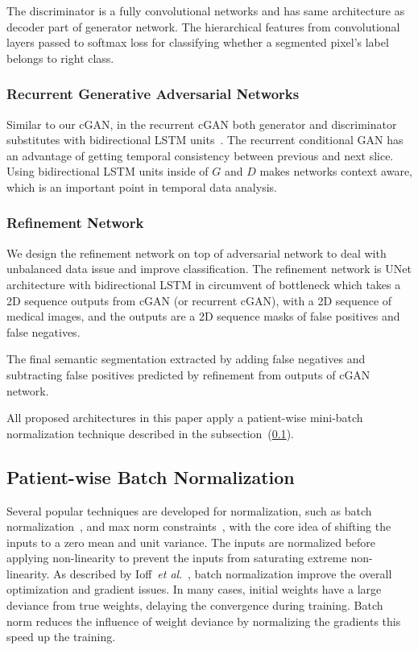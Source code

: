 \documentclass[10pt,twocolumn,letterpaper]{article}
\begin{document}
The discriminator is a fully convolutional networks and has same architecture as decoder part of generator network. The hierarchical features from convolutional layers passed to softmax loss for classifying whether a segmented pixel's label belongs to right class.

\subsubsection{Recurrent Generative Adversarial Networks}\label{method_sec1b}
Similar to our cGAN, in the recurrent cGAN both generator and discriminator substitutes with bidirectional LSTM units~\cite{graves2005framewise}.
The recurrent conditional GAN has an advantage of getting temporal consistency between previous and next slice.
Using bidirectional LSTM units inside of $G$ and $D$ makes networks context aware, which is an important point in temporal data analysis.

\subsubsection{Refinement Network}\label{refarch}

We design the refinement network on top of adversarial network to deal with unbalanced data issue and improve classification. The refinement network is UNet architecture with bidirectional LSTM in circumvent of bottleneck which takes a 2D sequence outputs from cGAN (or recurrent cGAN), with a 2D sequence of medical images, and the outputs are a 2D sequence masks of false positives and false negatives.

The final semantic segmentation extracted by adding false negatives and subtracting false positives predicted by refinement from outputs of cGAN network.

All proposed architectures in this paper apply a patient-wise mini-batch normalization technique described in the subsection~(\ref{batch_norm}).

\subsection{Patient-wise Batch Normalization}\label{batch_norm}
Several popular techniques are developed for normalization, such as batch normalization~\cite{IoffeS15}, and max norm constraints~\cite{srebro2005rank}, with the core idea of shifting the inputs to a zero mean and unit variance. The inputs are normalized before applying non-linearity to prevent the inputs from saturating extreme non-linearity. As described by Ioff~\textit{et al}.~\cite{IoffeS15}, batch normalization improve the overall optimization and gradient issues. In many cases, initial weights have a large deviance from true weights, delaying the convergence during training. Batch norm reduces the influence of weight deviance by normalizing the gradients this speed up the training.
\end{document}
